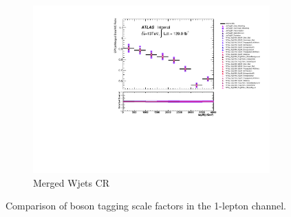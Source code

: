 \begin{figure}[ht]
    \begin{subfigure}[b]{0.3\textwidth}
        \centering
        \includegraphics[width=\textwidth]{figures/1lep/VTaggerUnc/VTagCRVjetMergedtagMjj_SystBreakDown.pdf}
        \caption{Merged Wjets CR}
        \label{fig:MergedWjetsCR}
    \end{subfigure}
    \caption{Comparison of boson tagging scale factors in the 1-lepton channel.}
    \label{fig:1LepVTaggerUnc}
\end{figure}






